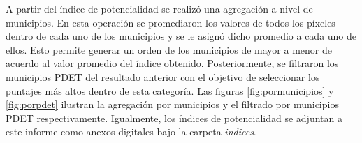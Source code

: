 A partir del índice de potencialidad se realizó una agregación a nivel de municipios.  En esta operación se promediaron los valores de todos los píxeles 
dentro de cada uno de los municipios y se le asignó dicho promedio a cada uno de ellos.  Esto permite generar un orden de los municipios de mayor a menor de 
acuerdo al valor promedio del índice obtenido.  Posteriormente, se filtraron los municipios PDET del resultado anterior con el objetivo de seleccionar los 
puntajes más altos dentro de esta categoría.  Las figuras \ref{fig:pormunicipios} y \ref{fig:porpdet} ilustran la agregación por municipios y el filtrado por 
municipios PDET respectivamente.  Igualmente, los índices de potencialidad se adjuntan a este informe como anexos digitales bajo la carpeta \textit{indices}.



% 
% 
